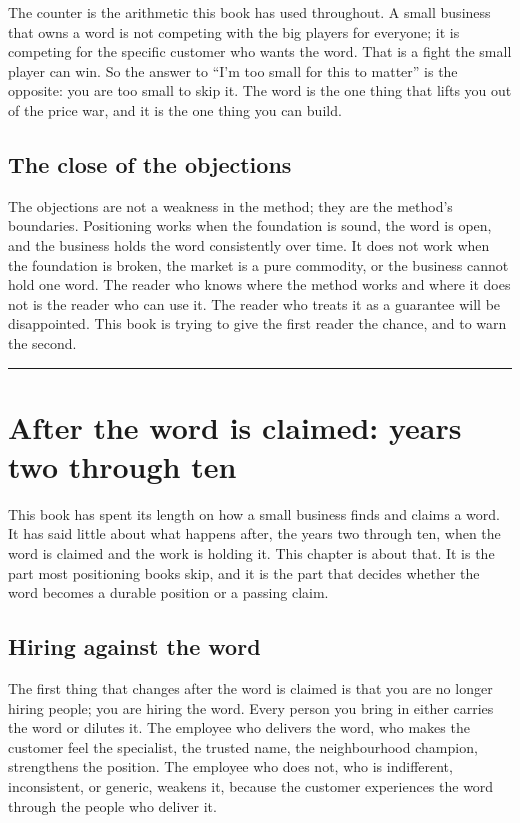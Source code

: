 \documentclass[10pt,twoside,openany]{memoir}
\newcommand{\needspacehead}{\needspace{4\baselineskip}}
\let\oldsection\section
\renewcommand{\section}{\needspacehead\oldsection}
\begin{document}
{{The counter is the arithmetic this book has used throughout. A small
business that owns a word is not competing with the big players for
everyone; it is competing for the specific customer who wants the word.
That is a fight the small player can win. So the answer to ``I'm too
small for this to matter'' is the opposite: you are too small to skip
it. The word is the one thing that lifts you out of the price war, and
it is the one thing you can build.

\section{The close of the objections}\label{the-close-of-the-objections}

The objections are not a weakness in the method; they are the method's
boundaries. Positioning works when the foundation is sound, the word is
open, and the business holds the word consistently over time. It does
not work when the foundation is broken, the market is a pure commodity,
or the business cannot hold one word. The reader who knows where the
method works and where it does not is the reader who can use it. The
reader who treats it as a guarantee will be disappointed. This book is
trying to give the first reader the chance, and to warn the second.

\begin{center}\rule{0.5\linewidth}{0.5pt}\end{center}

\FloatBarrier
\chapter{After the word is claimed: years two through
ten}\label{after-the-word-is-claimed-years-two-through-ten}

This book has spent its length on how a small business finds and claims
a word. It has said little about what happens after, the years two
through ten, when the word is claimed and the work is holding it. This
chapter is about that. It is the part most positioning books skip, and
it is the part that decides whether the word becomes a durable position
or a passing claim.

\section{Hiring against the word}\label{hiring-against-the-word}

The first thing that changes after the word is claimed is that you are
no longer hiring people; you are hiring the word. Every person you bring
in either carries the word or dilutes it. The employee who delivers the
word, who makes the customer feel the specialist, the trusted name, the
neighbourhood champion, strengthens the position. The employee who does
not, who is indifferent, inconsistent, or generic, weakens it, because
the customer experiences the word through the people who deliver it.

}}
\end{document}
